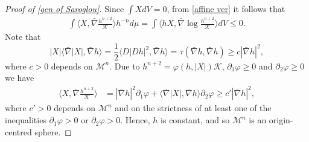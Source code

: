 \documentclass[12pt]{amsart}
\theoremstyle{definition}
\numberwithin{equation}{section}
\newcommand{\M}{\mathcal{M}}
\theoremstyle{remark}
\newtheorem{remark}[theorem]{Remark}
\numberwithin{equation}{section}
\begin{document}
\begin{proof}[Proof of \autoref{gen of Saroglou}]
Since $\int X dV=0$, from \eqref{affine ver} it follows that
\begin{align*}
\int \langle X, \bar{\nabla} \frac{h^{n+2}}{\mathcal{K}} \rangle h^{-n} d\mu = \int \langle hX, \bar{\nabla}\log \frac{h^{n+2}}{\mathcal{K}} \rangle dV\leq 0.
\end{align*}
Note that
\[
|X| \langle \bar{\nabla}|X|,\bar{\nabla}h\rangle = \frac{1}{2} \langle D |D h|^2 , \bar{\nabla}h\rangle =\tau(\bar{\nabla}h,\bar{\nabla}h) \geq c |\bar{\nabla}h|^2 ,
\]
where $c>0$ depends on $\M^n$. Due to $h^{n+2}=\varphi(h,|X|)\mathcal{K}$, $\partial_1\varphi\geq 0$ and $\partial_2\varphi \geq 0$ we have
\begin{align*}
\langle X, \bar{\nabla}\frac{h^{n+2}}{\mathcal{K}}\rangle&=|\bar{\nabla}h|^2\partial_1\varphi+\langle \bar{\nabla}|X|,\bar{\nabla}h\rangle\partial_2\varphi\geq c'|\bar{\nabla}h|^2,
\end{align*}
where $c'>0$ depends on $\M^n$ and on the strictness of at least one of the inequalities $\partial_1\varphi > 0$ or $\partial_2\varphi > 0$.
 Hence, $h$ is constant, and so $\M^n$ is an origin-centred sphere.
\end{proof}
\end{document}
